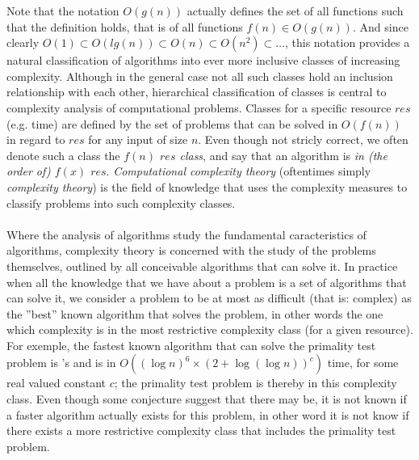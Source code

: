 	Note that the notation $O\left(g\left(n\right)\right)$ actually defines the set of all functions such that the definition holds, that is of all functions $f(n) \in O\left(g\left(n\right)\right)$.
	And since clearly $O(1) \subset O\left(lg\left(n\right)\right) \subset O\left(n\right) \subset O\left(n^2\right) \subset \ldots{} $, this notation provides a natural classification of algorithms into ever more inclusive classes of increasing complexity.
	Although in the general case not all such classes hold an inclusion relationship with each other, hierarchical classification of classes is central to complexity analysis of computational problems.
	Classes for a specific resource $res$ (e.g. time) are defined by the set of problems that can be solved in $O(f(n))$ in regard to $res$ for any input of size $n$.
	Even though not stricly correct, we often denote such a class the \emph{$f(n)$ $res$ class}, and say that an algorithm is \emph{in (the order of) $f(x)$ $res$}.
	\emph{Computational complexity theory} (oftentimes simply \emph{complexity theory}) is the field of knowledge that uses the complexity measures to classify problems into such complexity classes.

	\paragraph{}
	Where the analysis of algorithms study the fundamental caracteristics of algorithms, complexity theory is concerned with the study of the problems themselves, outlined by all conceivable algorithms that can solve it.
	In practice when all the knowledge that we have about a problem is a set of algorithms that can solve it, we consider a problem to be at most as difficult (that is: complex)  as the ''best'' known algorithm that solves the problem, in other words the one which complexity is in the most restrictive complexity class (for a given resource).
	For exemple, the fastest known algorithm that can solve the primality test problem is \textcite{lenstra2002primality}'s and is in $O\left(\left(\log n\right)^6\times{}\left(2 + \log(\log n)\right)^c\right)$ time, for some real valued constant $c$; the primality test problem is thereby in this complexity class.
	Even though some conjecture suggest that there may be, it is not known if a faster algorithm actually exists for this problem, in other word it is not know if there exists a more restrictive complexity class that includes the primality test problem.

